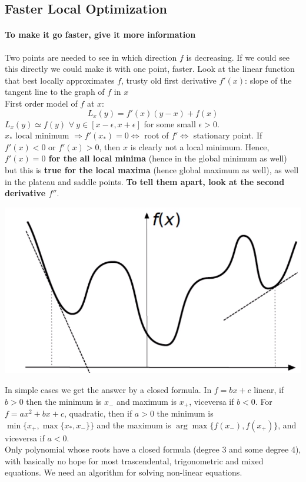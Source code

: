\documentclass[10pt]{report}
\begin{document}
\subsection{Faster Local Optimization}
\paragraph{To make it go faster, give it more information} Two points are needed to see in which direction $f$ is decreasing. If we could see this directly we could make it with one point, faster. Look at the linear function that best locally approximates $f$, trusty old first derivative $f'(x)$: slope of the tangent line to the graph of $f$ in $x$\\
First order model of $f$ at $x$: $$L_x(y)=f'(x)(y-x) + f(x)$$ $L_x(y) \simeq f(y)$ $\forall\:y\in[x-\epsilon, x+\epsilon]$ for some small $\epsilon > 0$.\\
$x_*$ local minimum $\Rightarrow f'(x_*) = 0 \Leftrightarrow$ root of $f' \Leftrightarrow$ stationary point. If $f'(x) < 0$ or $f'(x) > 0$, then $x$ is clearly not a local minimum. Hence, \textbf{$f'(x) = 0$ for the all local minima} (hence in the global minimum as well) but this is \textbf{true for the local maxima} (hence global maximum as well), as well in the plateau and saddle points. \textbf{To tell them apart, look at the second derivative $f''$}.
\begin{center}
	\includegraphics[scale=0.5]{1.png}
\end{center}
In simple cases we get the answer by a closed formula. In $f = bx + c$ linear, if $b > 0$ then the minimum is $x_-$ and maximum is $x_+$, viceversa if $b < 0$. For $f = ax^2 + bx + c$, quadratic, then if $a > 0$ the minimum is $\min\{ x_+, \max\{x_*, x_-\}\}$ and the maximum is $\arg\max\{f(x_-), f(x_+)\}$, and viceversa if $a < 0$.\\
Only polynomial whose roots have a closed formula (degree 3 and some degree 4), with basically no hope for most trascendental, trigonometric and mixed equations. We need an algorithm for solving non-linear equations.
\end{document}
